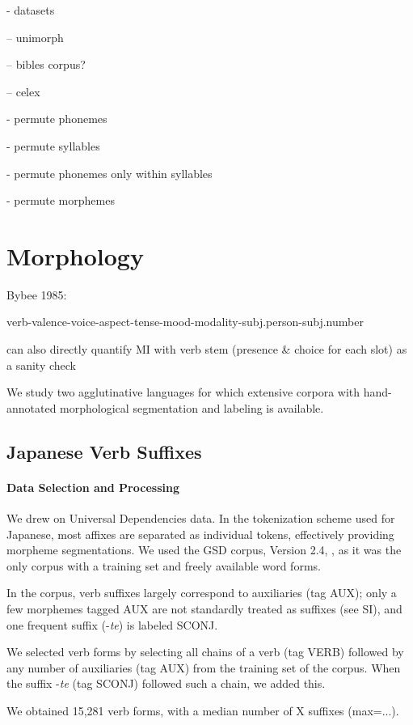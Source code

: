 - datasets

-- unimorph

-- bibles corpus?

-- celex


- permute phonemes

- permute syllables

- permute phonemes only within syllables

- permute morphemes 

\section{Morphology}

Bybee 1985:

verb-valence-voice-aspect-tense-mood-modality-subj.person-subj.number

can also directly quantify MI with verb stem (presence \& choice for each slot) as a sanity check

We study two agglutinative languages for which extensive corpora with hand-annotated morphological segmentation and labeling is available.

\subsection{Japanese Verb Suffixes}


\paragraph{Data Selection and Processing}
We drew on Universal Dependencies data.
In the tokenization scheme used for Japanese, most affixes are separated as individual tokens, effectively providing morpheme segmentations.
We used the GSD corpus, Version 2.4, \citep{tanaka2016universal, asahara2018universal}, as it was the only corpus with a training set and freely available word forms.

In the corpus, verb suffixes largely correspond to auxiliaries (tag AUX); only a few morphemes tagged AUX are not standardly treated as suffixes (see SI), and one frequent suffix (-\textit{te}) is labeled SCONJ.

We selected verb forms by selecting all chains of a verb (tag VERB) followed by any number of auxiliaries (tag AUX) from the training set of the corpus. When the suffix -\textit{te} (tag SCONJ) followed such a chain, we added this.

We obtained 15,281 verb forms, with a median number of X suffixes (max=...).

